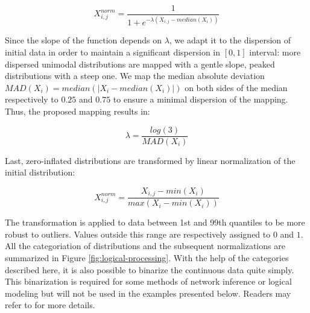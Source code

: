 \documentclass[a4paper,12pt,twoside,onecolumn,openright,final,oldfontcommands]{memoir}
\begin{document}
\[X_{i, j}^{norm}=\dfrac{1}{1+e^{-\lambda(X_{i, j}-median(X_{i}))}}\]

Since the slope of the function depends on \(\lambda\), we adapt it to
the dispersion of initial data in order to maintain a significant
dispersion in \([0, 1]\) interval: more dispersed unimodal distributions
are mapped with a gentle slope, peaked distributions with a steep one.
We map the median absolute deviation
\(MAD(X_{i})=median(|X_{i}-median(X_i)|)\) on both sides of the median
respectively to \(0.25\) and \(0.75\) to ensure a minimal dispersion of
the mapping. Thus, the proposed mapping results in:

\[\lambda=\dfrac{log(3)}{MAD(X_i)}\]

Last, zero-inflated distributions are transformed by linear
normalization of the initial distribution:

\[X_{i, j}^{norm}=\dfrac{X_{i, j}-min(X_{i})}{max(X_{i}-min(X_{i}))}\]

The transformation is applied to data between 1st and 99th quantiles to
be more robust to outliers. Values outside this range are respectively
assigned to \(0\) and \(1\). All the categoriation of distributions and
the subsequent normalizations are summarized in Figure
\ref{fig:logical-processing}. With the help of the categories described
here, it is also possible to binarize the continuous data quite simply.
This binarization is required for some methods of network inference or
logical modeling but will not be used in the examples presented below.
Readers may refer to \citet{beal2019personalization} for more details.
\end{document}
